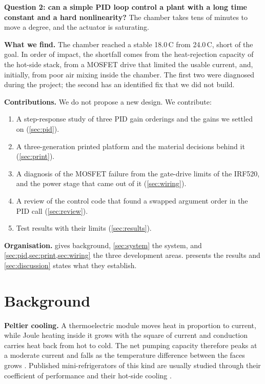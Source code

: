 \documentclass[11pt,letterpaper]{article}
\begin{document}
\textbf{Question 2: can a simple PID loop control a plant with a long time constant and a hard nonlinearity?} The chamber takes tens of minutes to move a degree, and the actuator is saturating.

\textbf{What we find.} The chamber reached a stable 18.0\,\textdegree C from 24.0\,\textdegree C, short of the goal. In order of impact, the shortfall comes from the heat-rejection capacity of the hot-side stack, from a MOSFET drive that limited the usable current, and, initially, from poor air mixing inside the chamber. The first two were diagnosed during the project; the second has an identified fix that we did not build.

\textbf{Contributions.} We do not propose a new design. We contribute:
\begin{enumerate}
\item A step-response study of three PID gain orderings and the gains we settled on (\cref{sec:pid}).
\item A three-generation printed platform and the material decisions behind it (\cref{sec:print}).
\item A diagnosis of the MOSFET failure from the gate-drive limits of the IRF520, and the power stage that came out of it (\cref{sec:wiring}).
\item A review of the control code that found a swapped argument order in the PID call (\cref{sec:review}).
\item Test results with their limits (\cref{sec:results}).
\end{enumerate}

\textbf{Organisation.}  gives background, \cref{sec:system} the system, and \cref{sec:pid,sec:print,sec:wiring} the three development areas.  presents the results and \cref{sec:discussion} states what they establish.

\section{Background}\label{sec:background}
\textbf{Peltier cooling.} A thermoelectric module moves heat in proportion to current, while Joule heating inside it grows with the square of current and conduction carries heat back from hot to cold. The net pumping capacity therefore peaks at a moderate current and falls as the temperature difference between the faces grows \citep{goldsmid2010,rowe2006}. Published mini-refrigerators of this kind are usually studied through their coefficient of performance and their hot-side cooling \citep{elnaggar2024,beck2018}.
\end{document}
